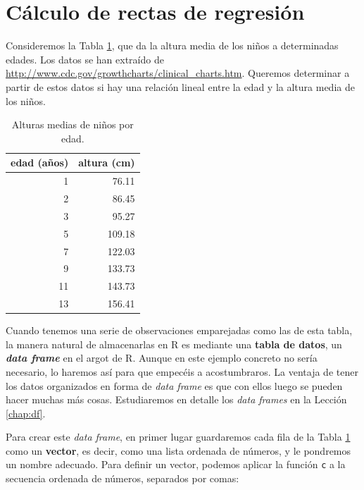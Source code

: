 \documentclass[
]{book}
\theoremstyle{definition}
\theoremstyle{definition}
\theoremstyle{definition}
\theoremstyle{remark}
\begin{document}
\hypertarget{sec:introlm}{%
\section{Cálculo de rectas de regresión}\label{sec:introlm}}

Consideremos la Tabla \ref{tab:nin1}, que da la altura media de los niños a determinadas edades. Los datos se han extraído de \url{http://www.cdc.gov/growthcharts/clinical_charts.htm}. Queremos determinar a partir de estos datos si hay una relación lineal entre la edad y la altura media de los niños.

\begin{table}

\caption{\label{tab:nin1}Alturas medias de niños por edad.}
\centering
\begin{tabular}[t]{r|r}
\hline
edad (años) & altura (cm)\\
\hline
1 & 76.11\\
\hline
2 & 86.45\\
\hline
3 & 95.27\\
\hline
5 & 109.18\\
\hline
7 & 122.03\\
\hline
9 & 133.73\\
\hline
11 & 143.73\\
\hline
13 & 156.41\\
\hline
\end{tabular}
\end{table}

Cuando tenemos una serie de observaciones emparejadas como las de esta tabla, la manera natural de almacenarlas en R es mediante una \textbf{tabla de datos}, un \textbf{\emph{data frame}} en el argot de R. Aunque en este ejemplo concreto no sería necesario, lo haremos así para que empecéis a acostumbraros. La ventaja de tener los datos organizados en forma de \emph{data frame} es que con ellos luego se pueden hacer muchas más cosas. Estudiaremos en detalle los \emph{data frames} en la Lección \ref{chap:df}.

Para crear este \emph{data frame}, en primer lugar guardaremos cada fila de la Tabla \ref{tab:nin1} como un \textbf{vector}, es decir, como una lista ordenada de números, y le pondremos un nombre adecuado. Para definir un vector, podemos aplicar la función \texttt{c} a la secuencia ordenada de números, separados por comas:
\end{document}
